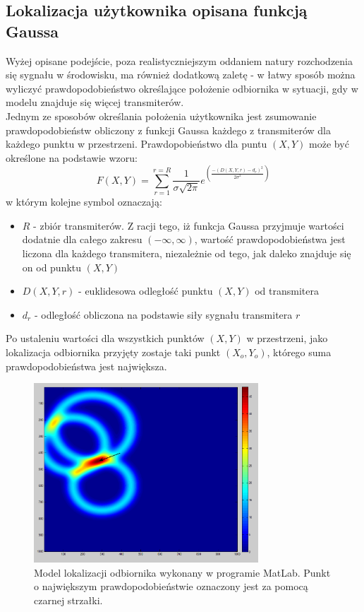 \subsection{Lokalizacja użytkownika opisana funkcją Gaussa}
Wyżej opisane podejście, poza realistyczniejszym oddaniem natury rozchodzenia się sygnału w środowisku, ma również dodatkową zaletę - w łatwy sposób można wyliczyć prawdopodobieństwo określające położenie odbiornika w sytuacji, gdy w modelu znajduje się więcej transmiterów.\\
Jednym ze sposobów określania położenia użytkownika jest zsumowanie prawdopodobieństw obliczony z funkcji Gaussa każdego z transmiterów dla każdego punktu w przestrzeni. Prawdopobieństwo dla puntu $(X,Y)$ może być określone na podstawie wzoru:
\begin{equation}
F(X,Y) = \sum_{r=1}^{r=R} \frac{1}{\sigma\sqrt{2\pi}}e^{\left(\frac{-(D(X,Y,r)-d_r)^2}{2\sigma^2}\right)}
\end{equation}
w którym kolejne symbol oznaczają:
\begin{itemize}
	\item $R$ - zbiór transmiterów. Z racji tego, iż funkcja Gaussa przyjmuje wartości dodatnie dla całego zakresu $(-\infty,\infty)$, wartość prawdopodobieństwa jest liczona dla każdego transmitera, niezależnie od tego, jak daleko znajduje się on od punktu $(X,Y)$
	\item $D(X,Y,r)$ - euklidesowa odległość punktu $(X,Y)$ od transmitera
	\item $d_r$ - odległość obliczona na podstawie siły sygnału transmitera $r$
\end{itemize}
Po ustaleniu wartości dla wszystkich punktów $(X,Y)$ w przestrzeni, jako lokalizacja odbiornika przyjęty zostaje taki punkt $(X_o,Y_o)$, którego suma prawdopodobieństwa jest największa.
\begin{figure}[H]			
	\centering
	\caption{Model lokalizacji odbiornika wykonany w programie MatLab. Punkt o największym prawdopodobieństwie oznaczony jest za pomocą czarnej strzałki.}
	\includegraphics[width=0.75\textwidth]{guasianRouter}
\end{figure}

